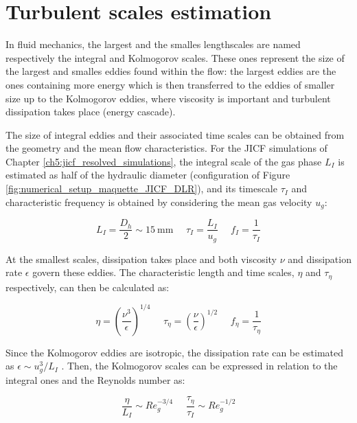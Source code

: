 \chapter{Turbulent scales estimation}
\label{app:turbulent_scales_estimation}





In fluid mechanics, the largest and the smalles lengthscales are named respectively the integral and Kolmogorov scales. These ones represent the size of the largest and smalles eddies found within the flow: the largest eddies are the ones containing more energy which is then transferred to the eddies of smaller size up to the Kolmogorov eddies, where viscosity is important and turbulent dissipation takes place (energy cascade).

The size of integral eddies and their associated time scales can be obtained from the geometry and the mean flow characteristics. For the JICF simulations of Chapter \ref{ch5:jicf_resolved_simulations}, the integral scale of the gas phase $L_I$ is estimated as half of the hydraulic diameter (configuration of Figure \ref{fig:numerical_setup_maquette_JICF_DLR}), and its timescale $\tau_I$ and characteristic frequency is obtained by considering the mean gas velocity $u_g$:

	\begin{equation}
	L_I = \frac{D_h}{2} \sim 15 ~ \mathrm{mm}  ~~~~~~ \tau_I = \frac{L_I}{u_g} ~~~~~~ f_I = \frac{1}{\tau_I}
	\end{equation}
	
At the smallest scales, dissipation takes place and both viscosity $\nu$ and dissipation rate $\epsilon$ govern these eddies. The characteristic length and time scales, $\eta$ and $\tau_\eta$ respectively, can then be calculated as:

\begin{equation}
\eta = \left( \frac{\nu^3}{\epsilon} \right)^{1/4} ~~~~~~ \tau_\eta = \left( \frac{\nu}{\epsilon} \right)^{1/2} ~~~~~~ f_\eta = \frac{1}{\tau_\eta}
\end{equation}

Since the Kolmogorov eddies are isotropic, the dissipation rate can be estimated as $\epsilon \sim u_g^3/L_I$ . Then, the Kolmogorov scales can be expressed in relation to the integral ones and the Reynolds number as:

\begin{equation}
\frac{\eta}{L_I} \sim Re_g^{-3/4} ~~~~~~ \frac{\tau_\eta}{\tau_I} \sim Re_g^{-1/2}
\end{equation}

